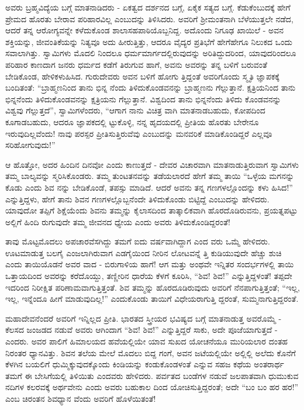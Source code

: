 ಅವರು ಬ್ರಹ್ಮವಿದ್ಯೆಯ ಬಗ್ಗೆ ಮಾತನಾಡಿದರು - ಏಕತ್ವದ ದರ್ಶನದ ಬಗ್ಗೆ, ಏಕೈಕ ಸತ್ಯದ ಬಗ್ಗೆ. ಕೆಡುಕೆಂಬುದಕ್ಕೆ ಹೇಗೆ ಪ್ರೇಮದ ಹೊರತು ಬೇರಾವ ಪರಿಹಾರವಿಲ್ಲ ಎಂಬುದನ್ನು ತಿಳಿಸಿದರು. ಅವರಿಗೆ ಶ‍್ರೀಮಂತನಾಗಿ ಬೆಳೆಯುತ್ತಲೇ ನಡೆದ, ಆದರೆ ತನ್ನ ಆರೋಗ್ಯವನ್ನೇ ಕಳೆದುಕೊಂಡ ಶಾಲಾಸಹಪಾಠಿಯೊಬ್ಬನಿದ್ದ. ಅದೊಂದು ನಿಗೂಢ ಖಾಯಿಲೆ - ಅವನ ಶಕ್ತಿಯನ್ನು, ಜೀವಂತಿಕೆಯನ್ನು ನಿತ್ಯವೂ ಅದು ಹೀರುತ್ತಿತ್ತು, ಆದರೂ ವೈದ್ಯರ ಪ್ರತಿಭೆಗೆ ಹೇಗೆಹೇಗೂ ನಿಲುಕದ ಒಂದು ಸವಾಲಾಗಿತ್ತು. ಸ್ವಾಮಿಗಳು ಮೊದಲಿ ನಿಂದಲೂ ಧರ್ಮಮಾರ್ಗದಲ್ಲಿರುವುದನ್ನು ಅರಿತಿದ್ದುದರಿಂದ, ಯಾವುದರಿಂದಲೂ ಪರಿಹಾರ ಕಾಣದಾಗ ಜನರು ಧರ್ಮದ ಕಡೆಗೆ ತಿರುಗುವ ಹಾಗೆ, ಅವನು ಅವರನ್ನು ತನ್ನ ಬಳಿಗೆ ಬರುವಂತೆ ಬೇಡಿಕೊಂಡ, ಹೇಳಿಕಳುಹಿಸಿದ. ಗುರುದೇವರು ಅವನ ಬಳಿಗೆ ಹೋಗು ತ್ತಿದ್ದಂತೆ ಅವರಿಗೊಂದು ಸ್ಮೃತಿ ಜ್ಞಾಪಕಕ್ಕೆ ಬಂದಿತಂತೆ: “ಬ್ರಾಹ್ಮಣನಿಂದ ತಾನು ಭಿನ್ನ ನೆಂದು ತಿಳಿದುಕೊಂಡವನನ್ನು ಬ್ರಾಹ್ಮಣನು ಗೆಲ್ಲುತ್ತಾನೆ. ಕ್ಷತ್ರಿಯನಿಂದ ತಾನು ಭಿನ್ನನೆಂದು ತಿಳಿದುಕೊಂಡವನನ್ನು ಕ್ಷತ್ರಿಯನು ಗೆಲ್ಲುತ್ತಾನೆ. ವಿಶ್ವದಿಂದ ತಾನು ಭಿನ್ನನೆಂದು ತಿಳಿದು ಕೊಂಡವನನ್ನು ವಿಶ್ವವು ಗೆಲ್ಲುತ್ತದೆ”, ಸ್ವಾಮಿಗಳೆಂದರು, “ಆಗಾಗ ನಾನು ವಿಚಿತ್ರ ವಾಗಿ ಮಾತನಾಡಬಹುದು, ಕೋಪದಿಂದ ಕೂಗಾಡಬಹುದು, ಆದರೂ ಜ್ಞಾಪಕದಲ್ಲಿ ಟ್ಟುಕೊಳ್ಳಿ, ನನ್ನ ಹೃದಯದಲ್ಲಿ ಪ್ರೀತಿಯ ಹೊರತು ಬೇರೇನೂ ಇರುವುದಿಲ್ಲವೆಂದು! ನಾವು ಪರಸ್ಪರ ಪ್ರೀತಿಸುತ್ತಿರುವೆವು ಎಂಬುದನ್ನು ಮನವರಿಕೆ ಮಾಡಿಕೊಂಡಿದ್ದರೆ ಎಲ್ಲವೂ ಸರಿಹೋಗುವುದು!”

ಆ ಹೊತ್ತೋ, ಅದರ ಹಿಂದಿನ ದಿನವೋ ಎಂದು ಕಾಣುತ್ತದೆ - ದೇವರ ವಿಚಾರವಾಗಿ ಮಾತನಾಡುತ್ತಿರುವಾಗ ಸ್ವಾಮಿಗಳು ತಮ್ಮ ಬಾಲ್ಯವನ್ನು ಸ್ಮರಿಸಿಕೊಂಡರು. ತಮ್ಮ ತುಂಟತನವನ್ನು ತಡೆಯಲಾರದೆ ಹೇಗೆ ತಮ್ಮ ತಾಯಿ “ಒಳ್ಳೆಯ ಮಗನನ್ನು ಕೊಡು ಎಂದು ಶಿವ ನನ್ನು ಬೇಡಿಕೊಂಡೆ, ತಪಸ್ಸು ಮಾಡಿದೆ. ಆದರೆ ಅವನು ತನ್ನ ಗಣಗಳಲ್ಲೊಂದನ್ನು ಕಳು ಹಿಸಿದ!” ಎನ್ನುತ್ತಿದ್ದಳು, ಹೇಗೆ ತಾನು ಶಿವನ ಗಣಗಳಲ್ಲೊಬ್ಬನೆಂದೇ ತಿಳಿದುಕೊಂಡು ಬಿಟ್ಟಿದ್ದೆ ಎಂಬುದನ್ನು ಹೇಳಿದರು. ಯಾವುದೋ ತಪ್ಪಿಗೆ ಶಿಕ್ಷೆಯೆಂದು ಶಿವನು ತಮ್ಮನ್ನು ಕೈಲಾಸದಿಂದ ತಾತ್ಕಾಲಿಕವಾಗಿ ಹೊರದೊಡಿರುವನು, ಪ್ರಯತ್ನಪಟ್ಟು ಅಲ್ಲಿಗೆ ಹಿಂದಿ ರುಗುವುದೇ ತಮ್ಮ ಜೀವನದ ಧ್ಯೇಯ ಎಂದು ಅವರು ತಿಳಿದುಕೊಂಡಿದ್ದರಂತೆ!

ತಾವು ಮೊಟ್ಟಮೊದಲು ಅಪಚಾರವೆಸಗಿದ್ದು ತಮಗೆ ಐದು ವರ್ಷವಾಗಿದ್ದಾಗ ಎಂದ ವರು ಒಮ್ಮೆ ಹೇಳಿದರು. ಊಟಮಾಡುತ್ತ ಬಲಗೈ ಎಂಜಲಾಗಿರುವಾಗ ಎಡಗೈಯಿಂದ ನೀರಿನ ಲೋಟವನ್ನೆ ತ್ತಿ ಕುಡಿಯುವುದೇ ಹೆಚ್ಚು ಶುಚಿ ಎಂದು ತಾಯಿಯೊಡನೆ ಅವರ ವಾದ - ಬಿರುಗಾಳಿಯ ಹಾಗೆ! ಆಗ ಮತ್ತು ಅಂಥವೇ ಇನ್ನಿತರ ಸಂದರ್ಭಗಳಲ್ಲಿ ತಾಯಿ ಒತ್ತಾಯದಿಂದ ಅವರನ್ನು ಕರೆದೊಯ್ದು, ತಣ್ಣೀರಿನ ಧಾರೆಯ ಕೆಳಗೆ ಕೂರಿಸಿ, “ಶಿವ! ಶಿವ!” ಎನ್ನುತ್ತಿದ್ದಳಂತೆ! ತಪ್ಪದೇ ಇದರಿಂದ ನಿರೀಕ್ಷಿತ ಪರಿಣಾಮವಾಗುತ್ತಿತ್ತಂತೆ. ಶಿವ ತಮ್ಮನ್ನು ಹೊರದೂಡಿರುವುದು ಅವರಿಗೆ ನೆನಪಾಗುತ್ತಿತ್ತಂತೆ; “ಇಲ್ಲ, ಇಲ್ಲ, ಇನ್ನೆಂದೂ ಹೀಗೆ ಮಾಡುವುದಿಲ್ಲ!” ಎಂದುಕೊಂಡು ತಾಯಿಗೆ ವಿಧೇಯರಾಗುತ್ತಿ ದ್ದರಂತೆ, ಸುಮ್ಮನಾಗುತ್ತಿದ್ದರಂತೆ.

ಮಹಾದೇವನೆಂದರೆ ಅವರಿಗೆ ಇನ್ನಿಲ್ಲದ ಪ್ರೀತಿ. ಭಾರತದ ಸ್ತ್ರೀಯರ ಭವಿಷ್ಯದ ಬಗ್ಗೆ ಮಾತನಾಡುತ್ತ ಅವರೊಮ್ಮೆ - ಕೆಲಸದ ಜಂಜಡದ ನಡುವೆ ಅವರು ಆಗಿಂದಾಗ “ಶಿವ! ಶಿವ!” ಎನ್ನುತ್ತಿದ್ದರೆ ಸಾಕು, ಅದೇ ಪೂಜೆಯಾಗುತ್ತದೆ - ಎಂದರು. ಅವರ ಪಾಲಿಗೆ ಹಿಮಾಲಯದ ಹವೆಯಲ್ಲಿಯೇ ಯಾವ ಸುಖದ ಯೋಚನೆಯೂ ಮುರಿಯಲಾರ ದಂತಹ ನಿರಂತರ ಧ್ಯಾನವಿತ್ತು. ಶಿವನ ತಲೆಯ ಮೇಲೆ ಮೊದಲು ಬಿದ್ದ ಗಂಗೆ, ಅವನ ಜಟೆಯಲ್ಲಿಯೇ ಅಲ್ಲಿಲ್ಲಿ ಅಲೆದು ಕೊನೆಗೆ ಕೆಳಗಿನ ಬಯಲಿಗೆ ಧುಮ್ಮಿಕ್ಕುವುದಕ್ಕೊಂದು ಕಿಂಡಿಯನ್ನು ಕಂಡುಕೊಂಡಳಂತೆ ಎನ್ನುವ ಸಹಜ ಕಥೆಯ ಅಂತರಾರ್ಥ ತಮಗೆ ಈ ಬೇಸಿಗೆಯಲ್ಲಿ ತಿಳಿಯಿತು ಎಂದವರು ಹೇಳಿದರು. ಪರ್ವತದ ಬಂಡೆಗಳ ನಡುವೆ ಜಲಪಾತವಾಗಿ ಧುಮುಕುವ ನದಿಗಳ ಕಲರವಕ್ಕೆ ಅರ್ಥವೇನು ಎಂದು ಅವರು ಬಹುಕಾಲ ದಿಂದ ಯೋಚಿಸುತ್ತಿದ್ದರಂತೆ; ಅದೇ “ಬಂ ಬಂ ಹರ ಹರ!” ಎಂಬ ಚಿರಂತನ ಶಿವಧ್ಯಾನ ವೆಂದು ಅವರಿಗೆ ಹೊಳೆಯಿತಂತೆ!


